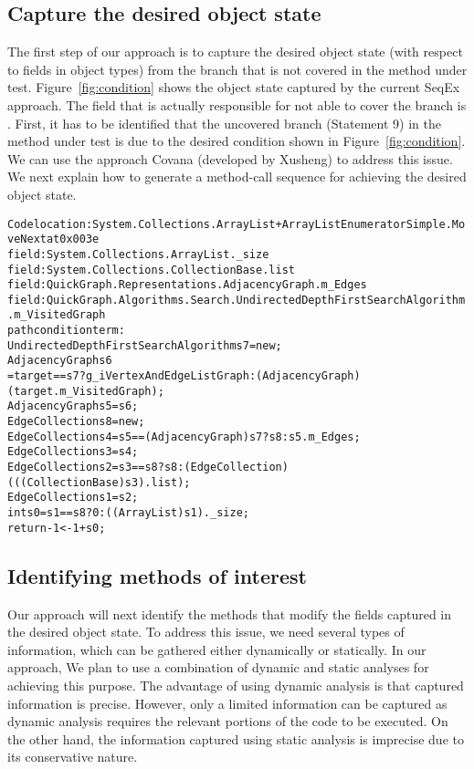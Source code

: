 \subsection{Capture the desired object state}

The first step of our approach is to capture the desired object state (with respect to fields in object types) from the branch that is not covered in the method under test. Figure~\ref{fig:condition} shows the object state captured by the current SeqEx approach. The field that is actually responsible for not able to cover the branch is . First, it has to be identified that the uncovered branch (Statement 9) in the method under test is due to the desired condition shown in Figure~\ref{fig:condition}. We can use the approach Covana (developed by Xusheng) to address this issue. We next explain how to generate a method-call sequence for achieving the desired object state.

\begin{figure*}[t]
\begin{CodeOut}
\begin{alltt}
Code location: System.Collections.ArrayList+ArrayListEnumeratorSimple.MoveNext at 0x003e
field: System.Collections.ArrayList._size
field: System.Collections.CollectionBase.list
field: QuickGraph.Representations.AdjacencyGraph.m_Edges
field: QuickGraph.Algorithms.Search.UndirectedDepthFirstSearchAlgorithm.m_VisitedGraph
path condition term: 
UndirectedDepthFirstSearchAlgorithm s7 = new;
AdjacencyGraph s6
   = target == s7 ? g_iVertexAndEdgeListGraph : (AdjacencyGraph)(target.m_VisitedGraph);
AdjacencyGraph s5 = s6;
EdgeCollection s8 = new;
EdgeCollection s4 = s5 == (AdjacencyGraph)s7 ? s8 : s5.m_Edges;
EdgeCollection s3 = s4;
EdgeCollection s2 = s3 == s8 ? s8 : (EdgeCollection)(((CollectionBase)s3).list);
EdgeCollection s1 = s2;
int s0 = s1 == s8 ? 0 : ((ArrayList)s1).\_size;
return -1 < -1 + s0;
\end{alltt}
\end{CodeOut}
\end{figure*}

\subsection{Identifying methods of interest}

Our approach will next identify the methods that modify the fields captured in the desired object state. To address this issue, we need several types of information, which can be gathered either dynamically or statically. In our approach, We plan to use a combination of dynamic and static analyses for achieving this purpose. The advantage of using dynamic analysis is that captured information is precise. However, only a limited information can be captured as dynamic analysis requires the relevant portions of the code to be executed. On the other hand, the information captured using static analysis is imprecise due to its conservative nature.

